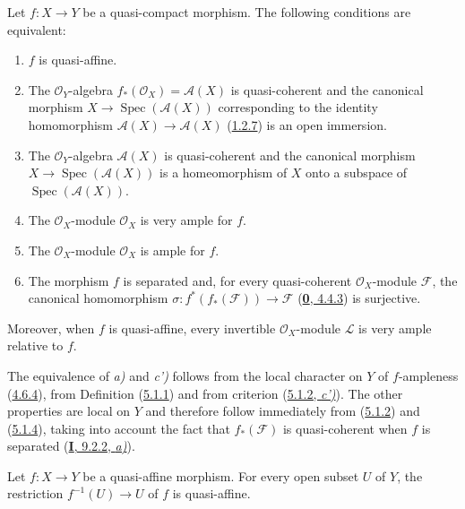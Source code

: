 \begin{proposition}[5.1.6]
\label{II.5.1.6}
Let $f:X\to Y$ be a quasi-compact morphism. The following conditions are
equivalent:
\begin{enumerate}
  \item[\rm{a)}] $f$ is quasi-affine.
  \item[\rm{b)}] The $\mathcal{O}_Y$-algebra
  $f_*(\mathcal{O}_X)=\mathcal{A}(X)$ is quasi-coherent and the canonical
  morphism $X\to\operatorname{Spec}(\mathcal{A}(X))$ corresponding to
  the identity homomorphism $\mathcal{A}(X)\to\mathcal{A}(X)$
  \textup{(\hyperref[II.1.2.7]{1.2.7})} is an open immersion.
  \item[\rm{b')}] The $\mathcal{O}_Y$-algebra $\mathcal{A}(X)$ is
  quasi-coherent and the canonical morphism
  $X\to\operatorname{Spec}(\mathcal{A}(X))$ is a homeomorphism of $X$
  onto a subspace of $\operatorname{Spec}(\mathcal{A}(X))$.
  \item[\rm{c)}] The $\mathcal{O}_X$-module $\mathcal{O}_X$ is very ample
  for $f$.
  \item[\rm{c')}] The $\mathcal{O}_X$-module $\mathcal{O}_X$ is ample for
  $f$.
  \item[\rm{d)}] The morphism $f$ is separated and, for every
  quasi-coherent $\mathcal{O}_X$-module $\mathcal{F}$, the canonical
  homomorphism $\sigma:f^*(f_*(\mathcal{F}))\to\mathcal{F}$
  \textup{(\hyperref[0.4.4.3]{\textbf{0}, 4.4.3})} is surjective.
\end{enumerate}
Moreover, when $f$ is quasi-affine, every invertible $\mathcal{O}_X$-module
$\mathcal{L}$ is very ample relative to $f$.
\end{proposition}

The equivalence of \emph{a)} and \emph{c')} follows from the local character on $Y$ of
$f$-ampleness (\hyperref[II.4.6.4]{4.6.4}), from Definition
(\hyperref[II.5.1.1]{5.1.1}) and from criterion
(\hyperref[II.5.1.2]{5.1.2, \emph{c')}}). The other properties are local on
$Y$
and therefore follow immediately from (\hyperref[II.5.1.2]{5.1.2}) and
(\hyperref[II.5.1.4]{5.1.4}), taking into account the fact that
$f_*(\mathcal{F})$ is quasi-coherent when $f$ is separated
(\hyperref[I.9.2.2]{\textbf{I}, 9.2.2, \emph{a)}}).

\begin{corollary}[5.1.7]
\label{II.5.1.7}
Let $f:X\to Y$ be a quasi-affine morphism. For every open subset $U$ of $Y$,
the restriction $f^{-1}(U)\to U$ of $f$ is quasi-affine.
\end{corollary}

